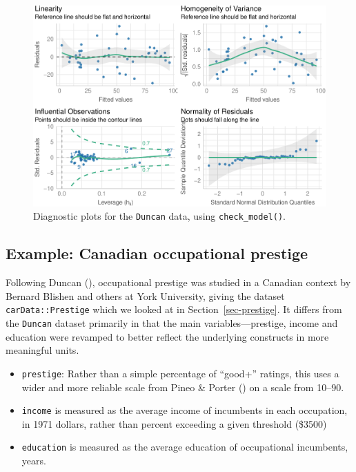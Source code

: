 \documentclass[
  letterpaper,
  10pt,
  krantz2]{krantz}
\begin{document}
{\begin{figure}[H]
{\includegraphics[width=1\textwidth,height=\textheight]{figs/ch06/fig-duncan-check-model-1.pdf}

}

\caption{\label{fig-duncan-check-model}Diagnostic plots for the
\texttt{Duncan} data, using \texttt{check\_model()}.}

\end{figure}%

\subsection{Example: Canadian occupational
prestige}\label{sec-example-prestige}

Following Duncan (), occupational prestige
was studied in a Canadian context by Bernard Blishen and others at York
University, giving the dataset \texttt{carData::Prestige} which we
looked at in Section~\ref{sec-prestige}. It differs from the
\texttt{Duncan} dataset primarily in that the main variables---prestige,
income and education were revamped to better reflect the underlying
constructs in more meaningful units.

\begin{itemize}
\item
  \texttt{prestige}: Rather than a simple percentage of ``good+''
  ratings, this uses a wider and more reliable scale from Pineo \&
  Porter () on a scale from
  10--90.
\item
  \texttt{income} is measured as the average income of incumbents in
  each occupation, in 1971 dollars, rather than percent exceeding a
  given threshold (\$3500)
\item
  \texttt{education} is measured as the average education of
  occupational incumbents, years.
\end{itemize}

}
\end{document}
